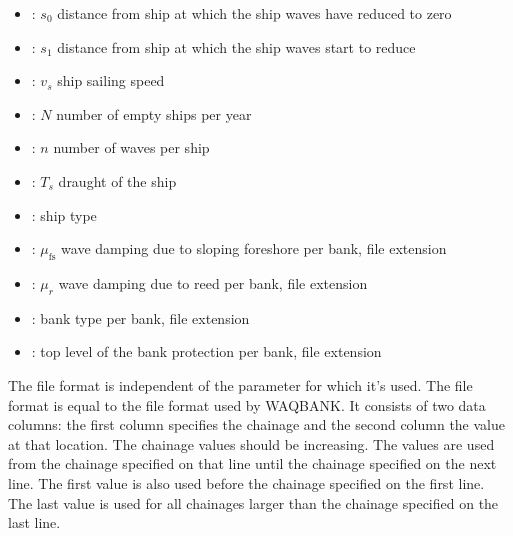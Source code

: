 \begin{itemize}
\item {}: $s_0$ distance from ship at which the ship waves have reduced to zero 
\item {}: $s_1$ distance from ship at which the ship waves start to reduce 
\item {}: $v_s$ ship sailing speed 
\item {}: $N$ number of empty ships per year 
\item {}: $n$ number of waves per ship \unitbrackets{-}
\item {}: $T_s$ draught of the ship 
\item {}: ship type \unitbrackets{-}
\item {}: $\mu_\text{fs}$ wave damping due to sloping foreshore  per bank, file extension 
\item {}: $\mu_r$ wave damping due to reed  per bank, file extension 
\item {}: bank type \unitbrackets{-} per bank, file extension 
\item {}: top level of the bank protection  per bank, file extension 
\end{itemize}

The file format is independent of the parameter for which it's used.
The file format is equal to the file format used by WAQBANK.
It consists of two data columns: the first column specifies the chainage and the second column the value at that location.
The chainage values should be increasing.
The values are used from the chainage specified on that line until the chainage specified on the next line.
The first value is also used before the chainage specified on the first line.
The last value is used for all chainages larger than the chainage specified on the last line.


